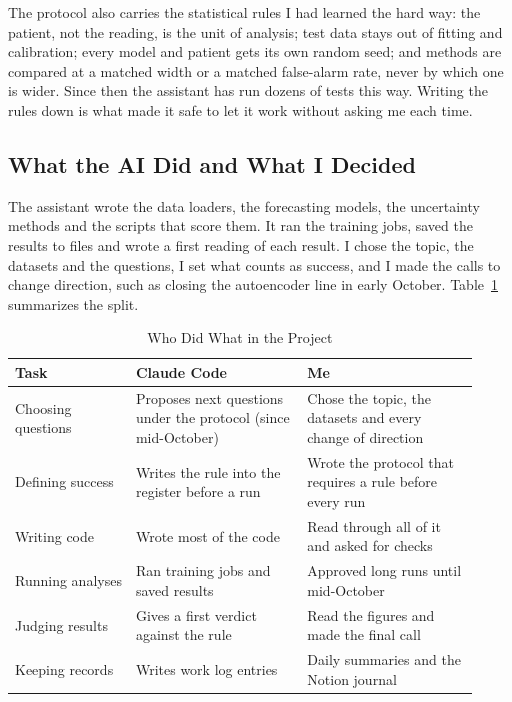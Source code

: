 The protocol also carries the statistical rules I had learned the hard way: the patient, not the reading, is the unit of analysis; test data stays out of fitting and calibration; every model and patient gets its own random seed; and methods are compared at a matched width or a matched false-alarm rate, never by which one is wider. Since then the assistant has run dozens of tests this way. Writing the rules down is what made it safe to let it work without asking me each time.

\subsection{What the AI Did and What I Decided}

The assistant wrote the data loaders, the forecasting models, the uncertainty methods and the scripts that score them. It ran the training jobs, saved the results to files and wrote a first reading of each result. I chose the topic, the datasets and the questions, I set what counts as success, and I made the calls to change direction, such as closing the autoencoder line in early October. Table~\ref{tab:ai-roles} summarizes the split.

\begin{table}[htbp]
\caption{Who Did What in the Project}
\label{tab:ai-roles}
\begin{tabular}{p{0.24\linewidth}p{0.34\linewidth}p{0.34\linewidth}}
\hline
Task & Claude Code & Me \\
\hline
Choosing questions & Proposes next questions under the protocol (since mid-October) & Chose the topic, the datasets and every change of direction \\
Defining success & Writes the rule into the register before a run & Wrote the protocol that requires a rule before every run \\
Writing code & Wrote most of the code & Read through all of it and asked for checks \\
Running analyses & Ran training jobs and saved results & Approved long runs until mid-October \\
Judging results & Gives a first verdict against the rule & Read the figures and made the final call \\
Keeping records & Writes work log entries & Daily summaries and the Notion journal \\
\hline
\end{tabular}
\end{table}

